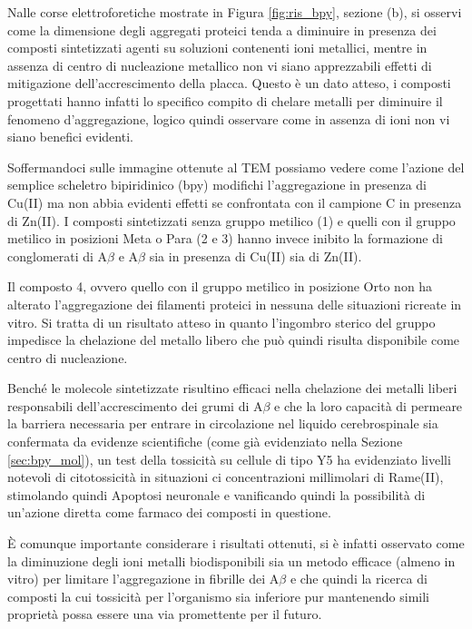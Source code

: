 \documentclass[a4paper, 12pt]{article}
\begin{document}
Nalle corse elettroforetiche mostrate in Figura \ref{fig:ris_bpy}, sezione (b), si osservi come la dimensione degli aggregati proteici tenda a diminuire in presenza dei composti sintetizzati agenti su soluzioni contenenti ioni metallici, mentre in assenza di centro di nucleazione metallico non vi siano apprezzabili effetti di mitigazione dell'accrescimento della placca. Questo è un dato atteso, i composti progettati hanno infatti lo specifico compito di chelare metalli per diminuire il fenomeno d'aggregazione, logico quindi osservare come in assenza di ioni non vi siano benefici evidenti.

Soffermandoci sulle immagine ottenute al TEM possiamo vedere come l'azione del semplice scheletro bipiridinico (bpy) modifichi l'aggregazione in presenza di Cu(II) ma non abbia evidenti effetti se confrontata con il campione C in presenza di Zn(II). I composti sintetizzati senza gruppo metilico (1) e quelli con il gruppo metilico in posizioni Meta o Para (2 e 3) hanno invece inibito la formazione di conglomerati di A$\beta$ e A$\beta$ sia in presenza di Cu(II) sia di Zn(II).

Il composto 4, ovvero quello con il gruppo metilico in posizione Orto non ha alterato l’aggregazione dei filamenti proteici in nessuna delle situazioni ricreate in vitro. Si tratta di un risultato atteso in quanto l’ingombro sterico del gruppo  impedisce la chelazione del metallo libero che può quindi risulta disponibile come centro di nucleazione.

Benché le molecole sintetizzate risultino efficaci nella chelazione dei metalli liberi responsabili dell’accrescimento dei grumi di A$\beta$ e che la loro capacità di permeare la barriera necessaria per entrare in circolazione nel liquido cerebrospinale sia confermata da evidenze scientifiche (come già evidenziato nella Sezione \ref{sec:bpy_mol}), un test della tossicità su cellule di tipo Y5 ha evidenziato livelli notevoli di citotossicità in situazioni ci concentrazioni millimolari di Rame(II), stimolando quindi Apoptosi neuronale e vanificando quindi la possibilità di un'azione diretta come farmaco dei composti in questione.

È comunque importante considerare i risultati ottenuti, si è infatti osservato come la diminuzione degli ioni metalli biodisponibili sia un metodo efficace (almeno in vitro) per limitare l'aggregazione in fibrille dei A$\beta$ e che quindi la ricerca di composti la cui tossicità per l'organismo sia inferiore pur mantenendo simili proprietà possa essere una via promettente per il futuro. \cite{ji_strategic_2017}




\newpage






\end{document}
